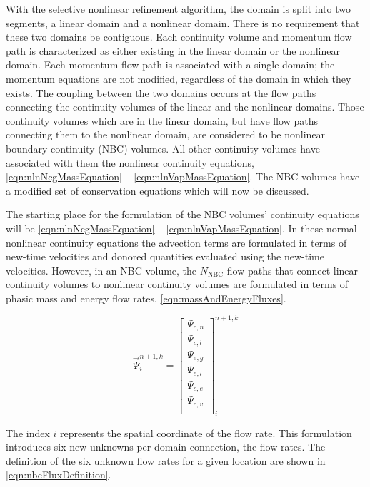 With the selective nonlinear refinement algorithm, the domain is split into two segments, a linear domain and a nonlinear domain.
There is no requirement that these two domains be contiguous.
Each continuity volume and momentum flow path is characterized as either existing in the linear domain or the nonlinear domain.
Each momentum flow path is associated with a single domain; the momentum equations are not modified, regardless of the domain in which they exists.
The coupling between the two domains occurs at the flow paths connecting the continuity volumes of the linear and the nonlinear domains.
Those continuity volumes which are in the linear domain, but have flow paths connecting them to the nonlinear domain, are considered to be nonlinear boundary continuity (NBC) volumes.
All other continuity volumes have associated with them the nonlinear continuity equations, \eqref{eqn:nlnNcgMassEquation} -- \eqref{eqn:nlnVapMassEquation}.
The NBC volumes have a modified set of conservation equations which will now be discussed.

The starting place for the formulation of the NBC volumes' continuity equations will be \eqref{eqn:nlnNcgMassEquation} -- \eqref{eqn:nlnVapMassEquation}.
In these normal nonlinear continuity equations the advection terms are formulated in terms of new-time velocities and donored quantities evaluated using the new-time velocities.
However, in an NBC volume, the $N_{\text{NBC}}$ flow paths that connect linear continuity volumes to nonlinear continuity volumes are formulated in terms of phasic mass and energy flow rates, \eqref{eqn:massAndEnergyFluxes}.

\begin{equation}
\label{eqn:massAndEnergyFluxes}
\vec{\Psi}^{n+1, k}_{i} = \begin{bmatrix}
\Psi_{c, n} \\
\Psi_{c, l} \\
\Psi_{e, g} \\
\Psi_{e, l} \\
\Psi_{c, e} \\
\Psi_{c, v} \\
\end{bmatrix}^{n+1, k}_{i}
\end{equation}

The index $i$ represents the spatial coordinate of the flow rate.
This formulation introduces six new unknowns per domain connection, the flow rates.
The definition of the six unknown flow rates for a given location are shown in \eqref{eqn:nbcFluxDefinition}.

